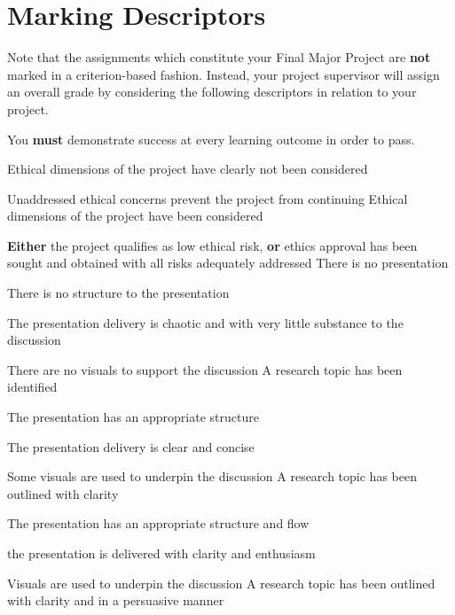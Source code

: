 \chapter{Marking Descriptors} \label{ch:rubrics}

Note that the assignments which constitute your Final Major Project are \textbf{not} marked in a criterion-based fashion.
Instead, your project supervisor will assign an overall grade by considering the following descriptors in relation to your project.

You \textbf{must} demonstrate success at every learning outcome in order to pass.

\rubricmasters
{}
\begin{markingrubric}
        \grade\fail  Ethical dimensions of the project have clearly not been considered
            \par     Unaddressed ethical concerns prevent the project from continuing
        \grade       Ethical dimensions of the project have been considered
            \par     \textbf{Either} the project qualifies as low ethical risk, \textbf{or} ethics approval has been sought and obtained with all risks adequately addressed
        \grade \fail 	There is no presentation
            \par 		There is no structure to the presentation
            \par        The presentation delivery is chaotic and with very little substance to the discussion   
            \par        There are no visuals to support the discussion
        \grade 		A research topic has been identified
            \par 	The presentation has an appropriate structure
            \par    The presentation delivery is clear and concise
            \par    Some visuals are used to underpin the discussion
        \grade		A research topic has been outlined with clarity
            \par 	The presentation has an appropriate structure and flow
            \par    the presentation is delivered with clarity and enthusiasm   
            \par    Visuals are used to underpin the discussion
        \grade		A research topic has been outlined with clarity and in a persuasive manner 

\end{markingrubric}
